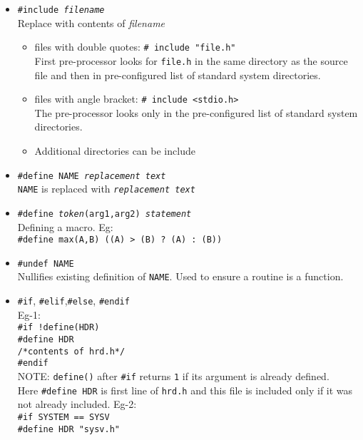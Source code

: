 \begin{multicols*}{3}
\begin{itemize}
\item \texttt{\#include \textit{filename}}\\
Replace with contents of \textit{filename}\\
\begin{itemize}
	\item files with double quotes: \texttt{\# include "file.h"}\\
		First pre-processor looks for \texttt{file.h} in the same directory as the source file and then in pre-configured list of standard system directories.
	\item files with angle bracket: \texttt{\# include <stdio.h>}\\
		The pre-processor looks only in the pre-configured list of standard system directories.
	\item Additional directories can be include
\end{itemize}
\item \texttt{\#define NAME \textit{replacement text}} \\
\texttt{NAME} is replaced with \texttt{\textit{replacement text}} \\
\item \texttt{\#define \textit{token}(arg1,arg2) \textit{statement}} \\
Defining a macro. Eg: \\
\texttt{\#define max(A,B) ((A) > (B) ? (A) : (B))}
\item \texttt{\#undef NAME} \\
Nullifies existing definition of \texttt{NAME}. Used to ensure a routine is a function.\\
\item \texttt{\#if}, \texttt{\#elif},\texttt{\#else}, \texttt{\#endif}\\
Eg-1:\\
\texttt{\#if !define(HDR)}\\
\texttt{\#define HDR}\\
\texttt{/*contents of hrd.h*/}\\
\texttt{\#endif}\\
NOTE: \texttt{define()} after \texttt{\#if} returns \texttt{1} if its argument is already defined.\\ 
Here \texttt{\#define HDR} is first line of \texttt{hrd.h} and this file is included only if it was not already included.
Eg-2:\\
\texttt{\#if SYSTEM == SYSV }\\
\qquad \texttt{\#define HDR "sysv.h"}\\

\end{itemize}
\end{multicols*}
